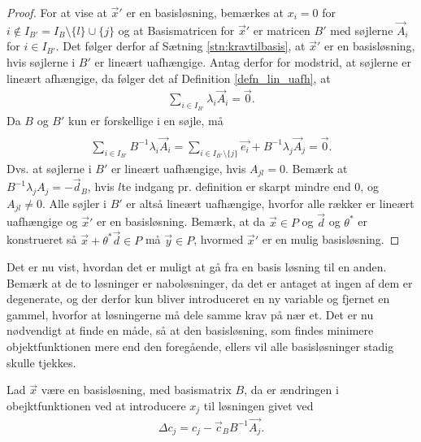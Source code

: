 \begin{proof}
For at vise at $\vec{x}'$ er en basisløsning, bemærkes at $x_i = 0$ for $i \notin I_{B'} = I_B\setminus\{l\}\cup\{j\}$ og at Basismatricen for $\vec{x}'$ er matricen $B'$ med søjlerne $\vec{A}_i$ for $i \in I_{B'}$. 
Det følger derfor af Sætning \ref{stn:kravtilbasis},
at $\vec{x}'$ er en basisløsning, hvis søjlerne i $B'$ er lineært uafhængige.
Antag derfor for modstrid, at søjlerne er lineært afhængige, da følger det af Definition \ref{defn_lin_uafh},
at
\begin{align*}
 \sum_{i \in I_{B'}} \lambda_i \vec{A}_i = \vec{0}.
\end{align*}
Da $B$ og $B'$ kun er forskellige i en søjle, må
\begin{align*}
 \\ \sum_{i \in I_{B'}}  B^{-1} \lambda_i \vec{A}_i  =\sum_{i \in I_{B'}\setminus \{j\}} \vec{e_i} + B^{-1} \lambda_j \vec{A}_j = \vec{0}.
\end{align*}
Dvs. at søjlerne i $B'$ er lineært uafhængige, hvis $A_{jl} = 0$.
Bemærk at $B^{-1} \lambda_j A_j = - \vec{d}_B$, hvis $l$te indgang pr. definition er skarpt mindre end $0$, og $A_{jl} \neq 0$.
Alle søjler i $B'$ er altså lineært uafhængige, hvorfor alle rækker er lineært uafhængige og $\vec{x}'$ er en basisløsning.
Bemærk, at da $\vec{x}\in P$ og $\vec{d}$ og $\theta^*$ er konstrueret så $\vec{x}+\theta^*\vec{d} \in P$ må $\vec{y} \in P$, hvormed $\vec{x}'$ er en mulig basisløsning.
\end{proof}
Det er nu vist, hvordan det er muligt at gå fra en basis løsning til en anden.
 Bemærk at de to løsninger er naboløsninger, da det er antaget at ingen af dem er degenerate, og der derfor kun bliver introduceret en ny variable og fjernet en gammel, hvorfor at løsningerne må dele samme krav på nær et. 
Det er nu nødvendigt at finde en måde, så at den basisløsning, som findes minimere objektfunktionen mere end den foregående, ellers vil alle basisløsninger stadig skulle tjekkes. 
\begin{stn}
Lad $\vec{x}$ være en basisløsning, med basismatrix $B$, da er ændringen i obejktfunktionen ved at introducere $x_j$ til løsningen givet ved
\begin{align*}
 \Delta c_j = c_j-\vec{c}_B B^{-1}\vec{A_j}.
\end{align*}
\label{stn:Deltac}
\end{stn}
